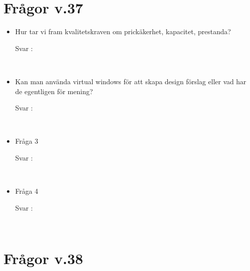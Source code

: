 \documentclass{article}
\date {#1}
\title {
    \documentTitle {Helsingborg Event and Convention Bureau}
    
    \documentDate {}
}
\begin{document}
\maketitle
\thispagestyle{empty}

\newpage




\newpage

\section{Frågor v.37}

 
\begin{itemize}
    \item Hur tar vi fram kvalitetskraven om prickäkerhet, kapacitet, prestanda?
        \begin{description}
            \item[Svar :]
        \end{description}
    \\
     \item Kan man använda virtual windows för att skapa design förslag eller vad har de egentligen för mening?
        \begin{description}
            \item[Svar :]
        \end{description}
    \\
    \item Fråga 3
        \begin{description}
            \item[Svar :]
        \end{description}  
    \\
     \item Fråga 4
        \begin{description}
            \item[Svar :]
        \end{description}
    \\
\end{itemize}



\section{Frågor v.38}

 
\end{document}
